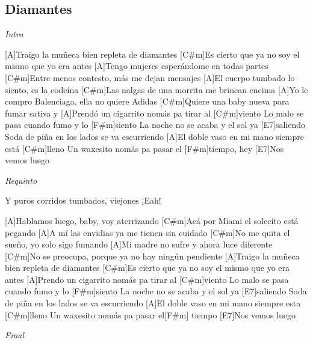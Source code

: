 \subsection{Diamantes}

\noindent
\vspace{1cm}

\begin{guitar}
	\begin{multicols}{2}
		
		\textit{Intro}
		\par

		[A]Traigo la muñeca bien repleta de diamantes
		[C#m]Es cierto que ya no soy el mismo que yo era antes
		[A]Tengo mujeres esperándome en todas partes
		[C#m]Entre menos contesto, más me dejan mensajes
		[A]El cuerpo tumbado lo siento, es la codeína
		[C#m]Las nalgas de una morrita me brincan encima
		[A]Yo le compro Balenciaga, ella no quiere Adidas
		[C#m]Quiere una baby nueva para fumar sativa y
		[A]Prendó un cigarrito nomás pa tirar al [C#m]viento
		Lo malo se pasa cuando fumo y lo [F#m]siento
		La noche no se acaba y el sol ya [E7]saliendo
		Soda de piña en los lados se va escurriendo
		[A]El doble vaso en mi mano siempre está [C#m]lleno
		Un waxesito nomás pa pasar el [F#m]tiempo, hey
		[E7]Nos vemos luego

		\par
		\textit{Requinto}
		\par

		Y puros corridos tumbados, viejones
		¡Eah!
		
		[A]Hablamos luego, baby, voy aterrizando
		[C#m]Acá por Miami el solecito está pegando
		[A]A mí las envidias ya me tienen sin cuidado
		[C#m]No me quita el sueño, yo solo sigo fumando
		[A]Mi madre no sufre y ahora luce diferente
		[C#m]No se preocupa, porque ya no hay ningún pendiente
		[A]Traigo la muñeca bien repleta de diamantes
		[C#m]Es cierto que ya no soy el mismo que yo era antes
		[A]Prendo un cigarrito nomás pa tirar al [C#m]viento
		Lo malo se pasa cuando fumo y lo [F#m]siento
		La noche no se acaba y el sol ya [E7]saliendo
		Soda de piña en los lados se va escurriendo
		[A]El doble vaso en mi mano siempre esta [C#m]lleno
		Un waxesito nomás pa pasar el[F#m] tiempo
		[E7]Nos vemos luego

		\par
		\textit{Final}

	\end{multicols}
\end{guitar}
